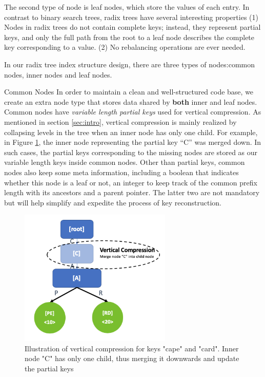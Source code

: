 \documentclass[sigplan,screen,nonacm]{acmart}
\makeatletter
\def\subsubsection{\@startsection{subsubsection}{3}%
  \z@{.5\linespacing\@plus.7\linespacing}{.1\linespacing}%
  {\normalfont\itshape}}
\makeatother
\begin{document}
The second type of node is leaf nodes, which store the values of each entry. In contrast to binary search trees, radix trees have several interesting properties (1) Nodes in radix trees do not contain complete keys; instead, they represent partial keys, and only the full path from the root to a leaf node describes the complete key corresponding to a value. (2) No rebalancing operations are ever needed. 

In our radix tree index structure design, there are three types of nodes:common nodes, inner nodes and leaf nodes. 

\subsubsection{Common Nodes}
In order to maintain a clean and well-structured code base, we create an extra node type that stores data shared by \textbf{both} inner and leaf nodes. Common nodes have {\itshape variable length partial keys} used for vertical compression. As mentioned in section \ref{sec:intro}, vertical compression is mainly realized by collapsing levels in the tree when an inner node has only one child. For example, in Figure \ref{fig:vertical-compression}, the inner node representing the partial key “C” was merged down. In such cases, the partial keys corresponding to the missing nodes are stored as our variable length keys inside common nodes. Other than partial keys, common nodes also keep some meta information, including a boolean that indicates whether this node is a leaf or not, an integer to keep track of the common prefix length with its ancestors and a parent pointer. The latter two are not mandatory but will help simplify and expedite the process of key reconstruction. 
\begin{figure}[t]
  \centering
  \includegraphics[width=\linewidth, height=6.5cm]{pic/vertical compression.png}
  \setlength{\belowcaptionskip}{-10pt} 
  \caption{Illustration of vertical compression for keys "cape" and "card". Inner node "C" has only one child, thus merging it downwards and update the partial keys}
  \label{fig:vertical-compression}
\end{figure}
\end{document}

